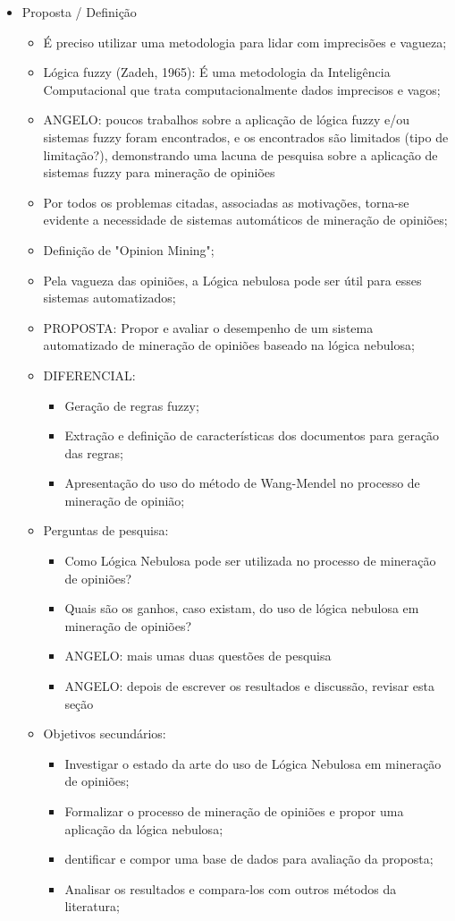 \documentclass[msc, a4paper, classic, pt]{ufbathesis}
\begin{document}
\begin{itemize}
\item Proposta / Definição
\begin{itemize}
\item É preciso utilizar uma metodologia para lidar com imprecisões e vagueza;
\item Lógica fuzzy (Zadeh, 1965): É uma metodologia da Inteligência Computacional que trata computacionalmente dados imprecisos e vagos;
\item ANGELO: poucos trabalhos sobre a aplicação de lógica fuzzy e/ou sistemas fuzzy foram encontrados, e os encontrados são limitados (tipo de limitação?), demonstrando uma lacuna de pesquisa sobre a aplicação de sistemas fuzzy para mineração de opiniões 
\item Por todos os problemas citadas, associadas as motivações, torna-se evidente a necessidade de sistemas automáticos de mineração de opiniões;
\item Definição de "Opinion Mining";
\item Pela vagueza das opiniões, a Lógica nebulosa pode ser útil para esses sistemas automatizados;
\item PROPOSTA: Propor e avaliar o desempenho de um sistema automatizado de mineração de opiniões baseado na lógica nebulosa;
\item DIFERENCIAL: 
\begin{itemize}
\item Geração de regras fuzzy;
\item Extração e definição de características dos documentos para geração das regras;
\item Apresentação do uso do método de Wang-Mendel no processo de mineração de opinião;
\end{itemize}

\item Perguntas de pesquisa:
\begin{itemize}
\item Como Lógica Nebulosa pode ser utilizada no processo de mineração de opiniões?
\item Quais são os ganhos, caso existam, do uso de lógica nebulosa em mineração de opiniões?
\item ANGELO: mais umas duas questões de pesquisa
\item ANGELO: depois de escrever os resultados e discussão, revisar esta seção 
\end{itemize}

\item Objetivos secundários:
\begin{itemize}
\item Investigar o estado da arte do uso de Lógica Nebulosa em mineração de opiniões;
\item Formalizar o processo de mineração de opiniões e propor uma aplicação da lógica nebulosa;
\item dentificar e compor uma base de dados para avaliação da proposta;
\item Analisar os resultados e compara-los com outros métodos da literatura;
\end{itemize}
\end{itemize}
\end{itemize}
\end{document}
